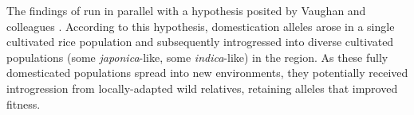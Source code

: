 \documentclass[11pt]{article}
\begin{document}
\begin{enumerate}
The findings of \cite{choi2018multiple} run in parallel with a hypothesis posited by Vaughan and colleagues \cite{vaughan2008evolving}.
According to this hypothesis, domestication alleles arose in a single cultivated rice population and subsequently introgressed into diverse cultivated populations (some \emph{japonica}-like, some \emph{indica}-like) in the region.
As these fully domesticated populations spread into new environments, they potentially received introgression from locally-adapted wild relatives, retaining alleles that improved fitness.




\end{enumerate}
\end{document}
